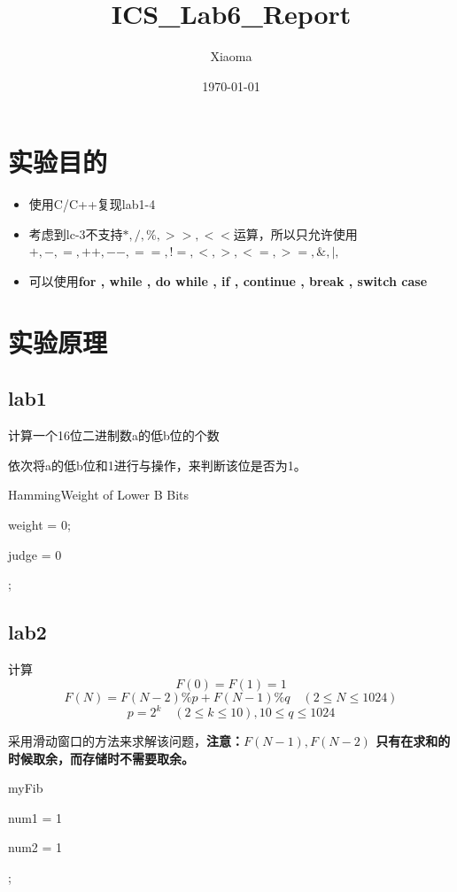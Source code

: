 \documentclass[12pt, a4paper, oneside]{ctexart}
\title{ICS\_Lab6\_Report}
\author{Xiaoma}
\date{\today}
\begin{document}
\maketitle
\section*{实验目的}
\begin{itemize}
    \item 使用C/C++复现lab1-4
    \item 考虑到lc-3不支持$*, /, \%, >>, <<$运算，所以只允许使用$ +, -, =, ++, --, ==, !=, <, >, <=, >=, \&, |, ~$
    \item 可以使用\textbf{for , while , do while , if , continue , break , switch case }
\end{itemize}
\section*{实验原理}
\subsection*{lab1}
计算一个16位二进制数a的低b位的个数

依次将a的低b位和1进行与操作，来判断该位是否为1。
\begin{algorithm*}
    \caption{HammingWeight of Lower B Bits}
    \label{alg:algorithm}
    \BlankLine
    weight = 0;

    judge = 0


    ;
\end{algorithm*}
\newpage
\subsection*{lab2}
计算
$$F(0) = F(1) = 1$$
$$F(N) = F(N-2) \% p + F(N-1) \% q \quad (2 \leq N \leq 1024)$$
$$p = 2^{k} \quad (2 \leq k \leq 10),10\leq q \leq 1024$$

采用滑动窗口的方法来求解该问题，\textbf{注意：$F(N-1),F(N-2)$
只有在求和的时候取余，而存储时不需要取余。}
\begin{algorithm*}
    \caption{myFib}
    \label{alg:algorithm}
    \BlankLine
    num1 = 1

    num2 = 1

    ;
\end{algorithm*}
\newpage
\end{document}
